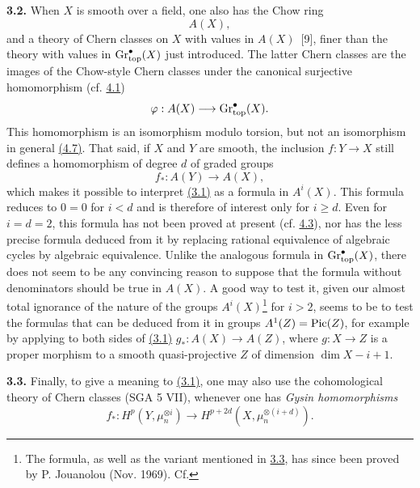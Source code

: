 \textbf{3.2.} When $X$ is smooth over a field, one also has the Chow ring
\[
  A(X),
\]
and a theory of Chern classes on $X$ with values in $A(X)$~[9], finer than the theory with values in $\operatorname{Gr}_{\mathrm{top}}^\bullet(X)$ just introduced. The latter Chern classes are the images of the Chow-style Chern classes under the canonical surjective homomorphism (cf. \hyperlink{sga6.e14.para.4-1}{4.1})
\[
  \varphi:A(X)\longrightarrow\operatorname{Gr}_{\mathrm{top}}^\bullet(X).
\]
This homomorphism is an isomorphism modulo torsion, but not an isomorphism in general \hyperlink{sga6.e14.para.4-7}{(4.7)}. That said, if $X$ and $Y$ are smooth, the inclusion $f:Y\to X$ still defines a homomorphism of degree $d$ of graded groups
\[
  f_*:A(Y)\longrightarrow A(X),
\]
which makes it possible to interpret \hyperlink{sga6.e14.eq.3-1}{(3.1)} as a formula in $A^i(X)$.
This formula reduces to $0=0$ for $i<d$ and is therefore of interest
only for $i\geq d$. Even for $i=d=2$, this formula has not been proved at
present (cf. \hyperlink{sga6.e14.para.4-3}{4.3}), nor has the less precise formula deduced from it by
replacing rational equivalence of algebraic cycles by algebraic
equivalence. Unlike the analogous formula in $\operatorname{Gr}_{\mathrm{top}}^\bullet(X)$, there
does not seem to be any convincing reason to suppose that the formula
without denominators should be true in $A(X)$. A good way to test it,
given our almost total ignorance of the nature of the groups
$A^i(X)$\footnote{The formula, as well as the variant mentioned in \hyperlink{sga6.e14.para.3-3}{3.3},
has since been proved by P. Jouanolou (Nov. 1969). Cf.} for $i>2$, seems
to be to test the formulas that can be deduced from it in groups
$A^1(Z)=\operatorname{Pic}(Z)$, for example by applying to both sides of \hyperlink{sga6.e14.eq.3-1}{(3.1)}
$g_*:A(X)\longrightarrow A(Z)$,
where $g:X\to Z$ is a proper morphism to a smooth quasi-projective $Z$ of dimension $\dim X-i+1$.

\textbf{3.3.} Finally, to give a meaning to \hyperlink{sga6.e14.eq.3-1}{(3.1)}, one may also use the cohomological theory of Chern classes (SGA 5 VII), whenever one has \emph{Gysin homomorphisms}
\[
  f_*:H^p(Y,\mu_n^{\otimes i})
  \longrightarrow H^{p+2d}(X,\mu_n^{\otimes(i+d)}).
\]
